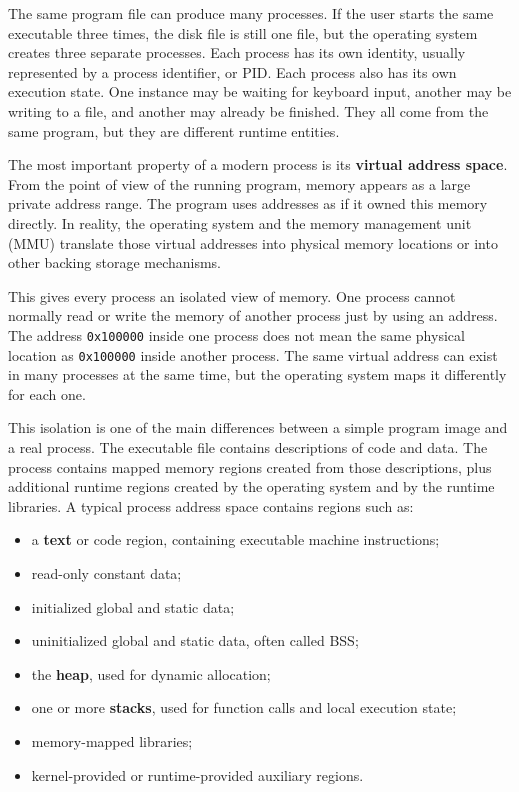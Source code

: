 The same program file can produce many processes. If the user starts the same executable three times, the disk file is still one file, but the operating system creates three separate processes. Each process has its own identity, usually represented by a process identifier, or PID. Each process also has its own execution state. One instance may be waiting for keyboard input, another may be writing to a file, and another may already be finished. They all come from the same program, but they are different runtime entities.

The most important property of a modern process is its \textbf{virtual address space}. From the point of view of the running program, memory appears as a large private address range. The program uses addresses as if it owned this memory directly. In reality, the operating system and the memory management unit (MMU) translate those virtual addresses into physical memory locations or into other backing storage mechanisms.

This gives every process an isolated view of memory. One process cannot normally read or write the memory of another process just by using an address. The address \texttt{0x100000} inside one process does not mean the same physical location as \texttt{0x100000} inside another process. The same virtual address can exist in many processes at the same time, but the operating system maps it differently for each one.

This isolation is one of the main differences between a simple program image and a real process. The executable file contains descriptions of code and data. The process contains mapped memory regions created from those descriptions, plus additional runtime regions created by the operating system and by the runtime libraries. A typical process address space contains regions such as:

\begin{itemize}
    \item a \textbf{text} or code region, containing executable machine instructions;
    \item read-only constant data;
    \item initialized global and static data;
    \item uninitialized global and static data, often called BSS;
    \item the \textbf{heap}, used for dynamic allocation;
    \item one or more \textbf{stacks}, used for function calls and local execution state;
    \item memory-mapped libraries;
    \item kernel-provided or runtime-provided auxiliary regions.
\end{itemize}

